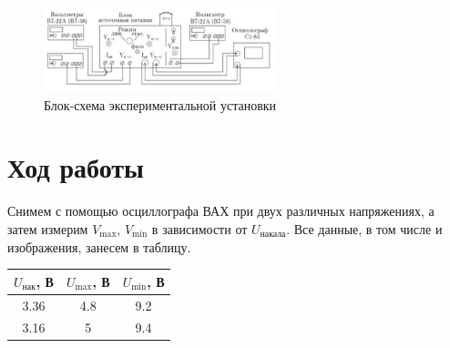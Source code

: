 \documentclass[a4paper,12pt]{article} %
\begin{document}
	\begin{figure}[H]
		\begin{center}
			\includegraphics[width = 0.6\textwidth]{3.jpg}
			\caption{Блок-схема экспериментальной установки}
		\end{center}
	\end{figure}
	\section*{Ход работы}
	Снимем с помощью осциллографа ВАХ при двух различных напряжениях, а затем измерим $V_{\max}$, $V_{\min}$ в зависимости от $U_{\text{накала}}$. Все данные, в том числе и изображения, занесем в таблицу.
	\begin{table}[H]
		\centering
		\begin{tabular}{|c|c|c|}
			\hline
			$U_\text{нак}$, В & $U_\text{max}$, В & $U_\text{min}$, В \\ \hline
			3.36   & 4.8    & 9.2    \\ \hline
			3.16   & 5      & 9.4    \\ \hline
		\end{tabular}
	\end{table}
	
\end{document}
